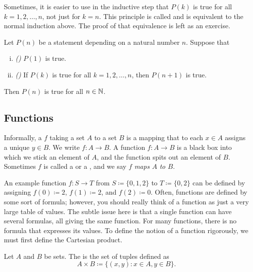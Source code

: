 Sometimes, it is easier to use in the inductive step
that $P(k)$ is true for all $k = 1,2,\ldots,n$, not just for $k=n$.
This principle is called \emph{} and is equivalent
to the normal induction above.  The proof of that
equivalence is left as an exercise.

\begin{thm}
Let $P(n)$ be a statement depending on a natural number $n$.  Suppose that
\begin{enumerate}[(i)]
\item \emph{()} $P(1)$ is true.
\item \emph{()} If $P(k)$ is true for all $k = 1,2,\ldots,n$, then $P(n+1)$ is true.
\end{enumerate}
Then $P(n)$ is true for all $n \in {\mathbb{N}}$.
\end{thm}

\subsection{Functions}

Informally,
a \emph{}
$f$ taking a set $A$ to a set $B$
is a mapping that to each $x \in A$ assigns a unique $y \in B$.  We write
$f \colon A \to B$.
A function $f
\colon A \to B$ is
a black box into which we stick an element of $A$,
and the function
spits out an element of $B$.
Sometimes $f$ is called a \emph{} or a
\emph{},
and we say $f$ \emph{maps $A$ to $B$}.

An example function 
$f \colon S \to T$ from $S \coloneqq \{ 0, 1, 2 \}$ to $T \coloneqq \{ 0, 2 \}$
can be defined
by assigning $f(0) \coloneqq 2$, $f(1) \coloneqq 2$, and $f(2) \coloneqq 0$.
%
Often, functions are defined by some sort of
formula; however, you should really think of a function as just a very large
table of values.
The subtle issue here is that a single function can have several 
formulas, all giving the same function.
For many functions, there is
no formula that expresses its values.
To define the notion of a function rigorously,
we must first define the Cartesian product.

\begin{defn}
Let $A$ and $B$ be sets.  The \emph{}
is the set of tuples defined as
\begin{equation*}
A \times B \coloneqq
\bigl\{ (x,y) : x \in A, y \in B \bigr\} .
\end{equation*}
\end{defn}

